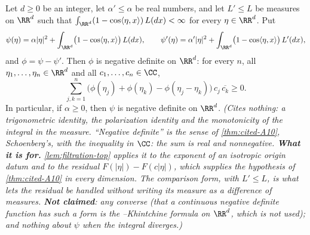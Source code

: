 \begin{lemma}
\label{lem:lk-negative-definite}
\leanok
Let $d \ge 0$ be an integer, let $\alpha' \le \alpha$ be real numbers, and let $L' \le L$ be
measures on $\RR^d$ such that $\int_{\RR^d}(1 - \cos\langle\eta,x\rangle)\,L(dx) < \infty$ for
every $\eta \in \RR^d$. Put
\[
  \psi(\eta) = \alpha|\eta|^2 + \int_{\RR^d}\bigl(1 - \cos\langle\eta,x\rangle\bigr)\,L(dx),
  \qquad
  \psi'(\eta) = \alpha'|\eta|^2 + \int_{\RR^d}\bigl(1 - \cos\langle\eta,x\rangle\bigr)\,L'(dx),
\]
and $\phi = \psi - \psi'$. Then $\phi$ is negative definite on $\RR^d$: for every $n$, all
$\eta_1, \dots, \eta_n \in \RR^d$ and all $c_1, \dots, c_n \in \CC$,
\[
  \sum_{j,k=1}^n \bigl(\phi(\eta_j) + \phi(\eta_k) - \phi(\eta_j - \eta_k)\bigr)\,c_j\,\overline{c_k}
  \ge 0 .
\]
In particular, if $\alpha \ge 0$, then $\psi$ is negative definite on $\RR^d$.
\statusT\quad\emph{(Cites nothing: a trigonometric identity, the polarization identity and the
monotonicity of the integral in the measure. ``Negative definite'' is the sense of
\ref{thm:cited-A10}, Schoenberg's, with the inequality in $\CC$: the sum is real and nonnegative.
\textbf{What it is for.} \ref{lem:filtration-top} applies it to the exponent of an isotropic origin
datum and to the residual $F(|\eta|) - F(c|\eta|)$, which supplies the hypothesis of
\ref{thm:cited-A10} in every dimension. The comparison form, with $L' \le L$, is what lets the
residual be handled without writing its \Levy{} measure as a difference of measures.
\textbf{Not claimed}: any converse (that a continuous negative definite function has such a form is
the \Levy--Khintchine formula on $\RR^d$, which is not used); and nothing about $\psi$ when the
integral diverges.)}
\end{lemma}

